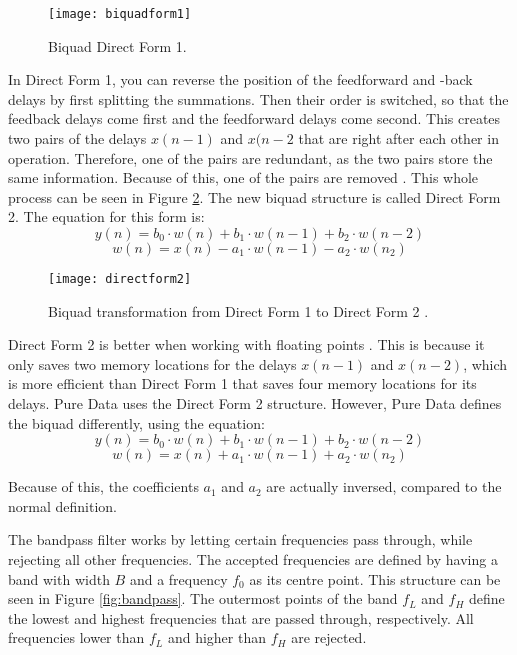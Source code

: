 \begin{figure}
\centering
\texttt{[image: biquadform1]}
\caption{Biquad Direct Form 1.}
\label{fig:biquadform1}
\end{figure}

In Direct Form 1, you can reverse the position of the feedforward and -back delays by first splitting the summations. Then their order is switched, so that the feedback delays come first and the feedforward delays come second. This creates two pairs of the delays \(x(n-1)\) and \(x(n-2\) that are right after each other in operation. Therefore, one of the pairs are redundant, as the two pairs store the same information. Because of this, one of the pairs are removed \cite{Redmon2003}. This whole process can be seen in Figure \ref{fig:biquadtransform}. The new biquad structure is called Direct Form 2. The equation for this form is\cite{Nederland2016}:
\[y(n) = b_0 \cdot w(n) + b_1 \cdot w(n-1) + b_2 \cdot w(n-2)\]
\[w(n) = x(n) - a_1 \cdot w(n-1) - a_2 \cdot w(n_2)\]

\begin{figure}
\centering
\texttt{[image: directform2]}
\caption{Biquad transformation from Direct Form 1 to Direct Form 2 \cite{Redmon2003}.}
\label{fig:biquadtransform}
\end{figure}

Direct Form 2 is better when working with floating points \cite{Redmon2003}. This is because it only saves two memory locations for the delays \(x(n-1)\) and \(x(n-2)\), which is more efficient than Direct Form 1 that saves four memory locations for its delays. Pure Data uses the Direct Form 2 structure. However, Pure Data defines the biquad differently, using the equation:
\[y(n) = b_0 \cdot w(n) + b_1 \cdot w(n-1) + b_2 \cdot w(n-2)\]
\[w(n) = x(n) + a_1 \cdot w(n-1) + a_2 \cdot w(n_2)\]

Because of this, the coefficients \(a_1\) and \(a_2\) are actually inversed, compared to the normal definition.

The bandpass filter works by letting certain frequencies pass through, while rejecting all other frequencies. The accepted frequencies are defined by having a band with width \(B\) and a frequency \(f_0\) as its  centre point. This structure can be seen in Figure \ref{fig:bandpass}. The outermost points of the band \(f_L\) and \(f_H\) define the lowest and highest frequencies that are passed through, respectively. All frequencies lower than \(f_L\) and higher than \(f_H\) are rejected.


